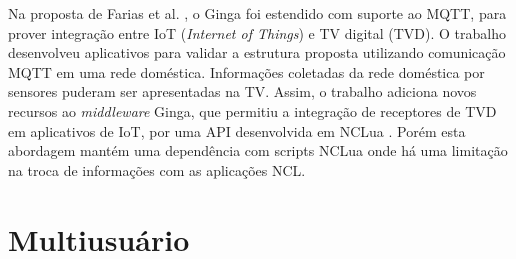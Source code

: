Na proposta de Farias et al. \cite{de2020extensions}, o Ginga foi estendido com suporte ao MQTT, para prover integração entre IoT (\textit{Internet of Things}) \cite{gubbi2013internet} e TV digital (TVD). O trabalho desenvolveu aplicativos para validar a estrutura proposta utilizando comunicação MQTT em uma rede doméstica. Informações coletadas da rede doméstica por sensores puderam ser apresentadas na TV. Assim, o trabalho adiciona novos recursos ao \textit{middleware} Ginga, que permitiu a integração de receptores de TVD em aplicativos de IoT, por uma API desenvolvida em NCLua \cite{sant2008nclua}. Porém esta abordagem mantém uma dependência com scripts NCLua onde há uma limitação na troca de informações com as aplicações NCL.

\begin{comment}

\begin{table}[h]
\centering
{
  \renewcommand\arraystretch{1.25}
  \begin{tabular}{|p{1,5cm}|p{6cm}|p{1,5cm}|p{2cm}|} \hline
   \multicolumn{1}{|c|}{Trabalho} & \multicolumn{1}{|c|}{Descrição} & \multicolumn{1}{c|}{Média (ms)} & \multicolumn{1}{c|}{Confiança} \\\hline
    1 & 1 usuário com 5 propriedades &  0  & 1,09E-09    \\\hline
    2 & 5 usuários com 5 propriedades &  1  & 2,04E-09   \\\hline
    3 & 10 usuários com 5 propriedades &  1  & 7,76E-10  \\\hline
    4 & 5 usuários com 10 propriedades &  1  & 1,06E-09  \\\hline
    5 & 10 usuários com 10 propriedades &  1  & 1,47E-09 \\\hline
   \end{tabular}
\caption{Tabela comparativa dos trabalhos relacionados a multimodalidade}
\label{tab:compMultimodalidade}
}
\end{table}
%
\end{comment}
\section {Multiusuário}


